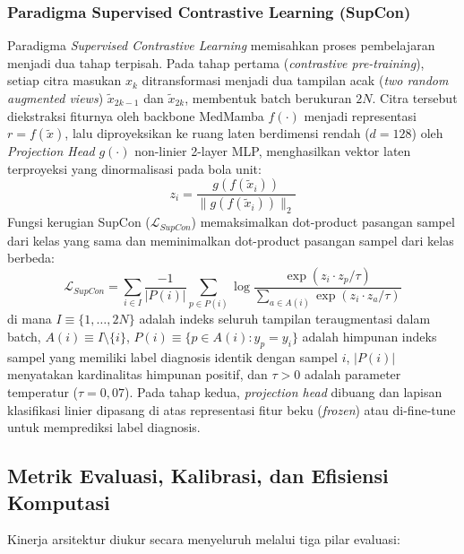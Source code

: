 \subsubsection{Paradigma Supervised Contrastive Learning (SupCon)}
Paradigma \textit{Supervised Contrastive Learning} \cite{khosla2020supervised} memisahkan proses pembelajaran menjadi dua tahap terpisah. Pada tahap pertama (\textit{contrastive pre-training}), setiap citra masukan $x_k$ ditransformasi menjadi dua tampilan acak (\textit{two random augmented views}) $\tilde{x}_{2k-1}$ dan $\tilde{x}_{2k}$, membentuk batch berukuran $2N$. Citra tersebut diekstraksi fiturnya oleh backbone MedMamba $f(\cdot)$ menjadi representasi $r = f(\tilde{x})$, lalu diproyeksikan ke ruang laten berdimensi rendah ($d=128$) oleh \textit{Projection Head} $g(\cdot)$ non-linier 2-layer MLP, menghasilkan vektor laten terproyeksi yang dinormalisasi pada bola unit:
\begin{equation}
	z_i = \frac{g(f(\tilde{x}_i))}{\|g(f(\tilde{x}_i))\|_2}
\end{equation}
Fungsi kerugian SupCon ($\mathcal{L}_{SupCon}$) memaksimalkan dot-product pasangan sampel dari kelas yang sama dan meminimalkan dot-product pasangan sampel dari kelas berbeda:
\begin{equation}
	\mathcal{L}_{SupCon} = \sum_{i \in I} \frac{-1}{|P(i)|} \sum_{p \in P(i)} \log \frac{\exp(z_i \cdot z_p / \tau)}{\sum_{a \in A(i)} \exp(z_i \cdot z_a / \tau)}
\end{equation}
di mana $I \equiv \{1, \dots, 2N\}$ adalah indeks seluruh tampilan teraugmentasi dalam batch, $A(i) \equiv I \setminus \{i\}$, $P(i) \equiv \{p \in A(i) : y_p = y_i\}$ adalah himpunan indeks sampel yang memiliki label diagnosis identik dengan sampel $i$, $|P(i)|$ menyatakan kardinalitas himpunan positif, dan $\tau > 0$ adalah parameter temperatur ($\tau = 0,07$). Pada tahap kedua, \textit{projection head} dibuang dan lapisan klasifikasi linier dipasang di atas representasi fitur beku (\textit{frozen}) atau di-fine-tune untuk memprediksi label diagnosis.

\subsection{Metrik Evaluasi, Kalibrasi, dan Efisiensi Komputasi} \label{II.Teori.Evaluasi}
Kinerja arsitektur diukur secara menyeluruh melalui tiga pilar evaluasi:

